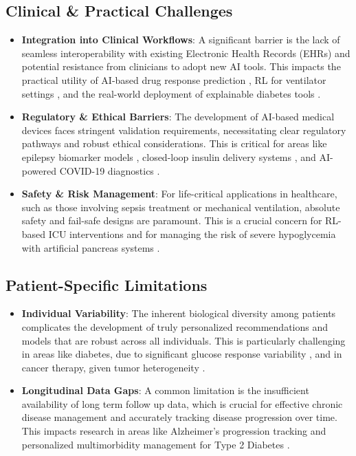 \documentclass[runningheads]{llncs}
\begin{document}
\subsection{Clinical \& Practical Challenges}
\begin{itemize}
    \item \textbf{Integration into Clinical Workflows}: A significant barrier is the lack of seamless interoperability with existing Electronic Health Records (EHRs) and potential resistance from clinicians to adopt new AI tools. This impacts the practical utility of AI-based drug response prediction \cite{article_1}, RL for ventilator settings \cite{article_24}, and the real-world deployment of explainable diabetes tools \cite{article_2}.
    \item \textbf{Regulatory \& Ethical Barriers}: The development of AI-based medical devices faces stringent validation requirements, necessitating clear regulatory pathways and robust ethical considerations. This is critical for areas like epilepsy biomarker models \cite{article_1}, closed-loop insulin delivery systems \cite{article_22}, and AI-powered COVID-19 diagnostics \cite{article_20,article_23}.
    \item \textbf{Safety \& Risk Management}: For life-critical applications in healthcare, such as those involving sepsis treatment or mechanical ventilation, absolute safety and fail-safe designs are paramount. This is a crucial concern for RL-based ICU interventions \cite{article_13,article_24} and for managing the risk of severe hypoglycemia with artificial pancreas systems \cite{article_22}.
\end{itemize}

\subsection{Patient-Specific Limitations}
\begin{itemize}
    \item \textbf{Individual Variability}: The inherent biological diversity among patients complicates the development of truly personalized recommendations and models that are robust across all individuals. This is particularly challenging in areas like diabetes, due to significant glucose response variability \cite{article_9}, and in cancer therapy, given tumor heterogeneity \cite{article_19}.
    \item \textbf{Longitudinal Data Gaps}: A common limitation is the insufficient availability of long term follow up data, which is crucial for effective chronic disease management and accurately tracking disease progression over time. This impacts research in areas like Alzheimer's progression tracking \cite{article_3} and personalized multimorbidity management for Type 2 Diabetes \cite{article_18}.
\end{itemize}
\end{document}
